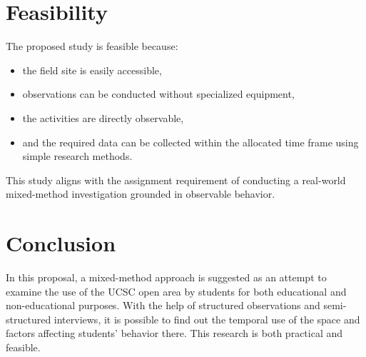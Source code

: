 \documentclass[12pt]{report}
\begin{document}
\chapter{Feasibility}

The proposed study is feasible because:

\begin{itemize}
    \item the field site is easily accessible,
    \item observations can be conducted without specialized equipment,
    \item the activities are directly observable,
    \item and the required data can be collected within the allocated time frame using simple research methods.
\end{itemize}

This study aligns with the assignment requirement of conducting a real-world mixed-method investigation grounded in observable behavior.

{
\renewcommand{\clearpage}{}
  \renewcommand{\cleardoublepage}{}
  \chapter{Conclusion}
}

In this proposal, a mixed-method approach is suggested as an attempt to examine the use of the UCSC open area by students for both educational and non-educational purposes. With the help of structured observations and semi-structured interviews, it is possible to find out the temporal use of the space and factors affecting students' behavior there. This research is both practical and feasible.

\end{document}
